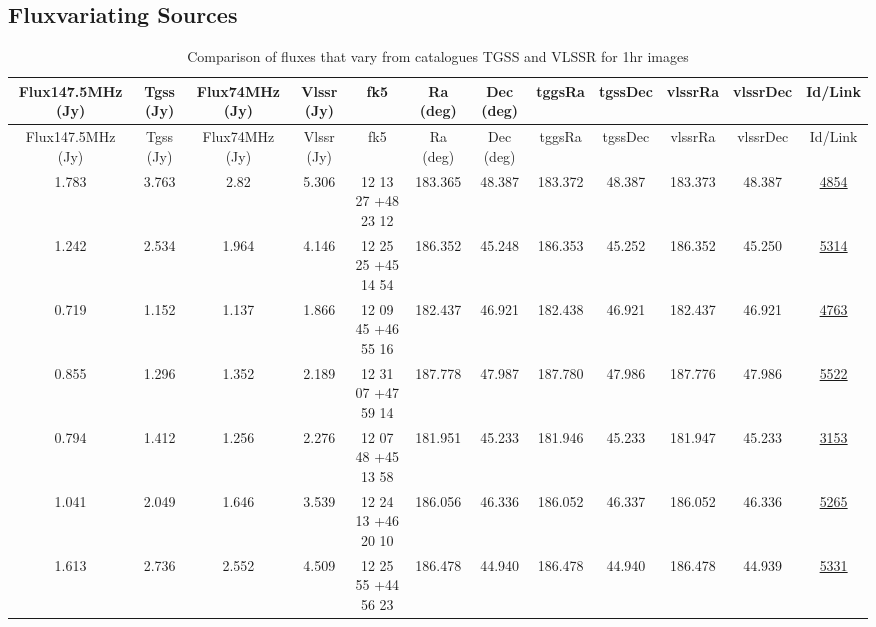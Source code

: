 \documentclass{article}
\begin{document}
\begin{landscape}

\section{Fluxvariating Sources}\label{varsection:KmeulenSimSource:1hr}

\begin{longtable}{c|c|c|c|c|c|c|c|c|c|c|c} 
\toprule 
Flux147.5MHz (Jy) & Tgss (Jy) & Flux74MHz (Jy)& Vlssr (Jy) & fk5 & Ra (deg) & Dec (deg) &tggsRa&tgssDec&vlssrRa&vlssrDec& Id/Link \\\midrule 
\endfirsthead 
\toprule 
Flux147.5MHz (Jy) & Tgss (Jy) & Flux74MHz (Jy)& Vlssr (Jy)& fk5 & Ra (deg) & Dec (deg)  &tggsRa&tgssDec&vlssrRa&vlssrDec& Id/Link \\\midrule 
\endhead 
\bottomrule 
\endfoot 
\bottomrule
\caption{ Comparison of fluxes that vary from catalogues TGSS and VLSSR for 1hr images} 
\endlastfoot
\label{KmeulenSimSource:1hr:tablevar}
1.783 & 3.763 & 2.82 & 5.306 & 12 13 27 +48 23 12 &  183.365 & 48.387 &  183.372 & 48.387 & 183.373 & 48.387 & \href{http://banana.transientskp.org/r4/vlo_KmeulenSimSource/runningcatalog/4854}{4854}  \\
1.242 & 2.534 & 1.964 & 4.146 & 12 25 25 +45 14 54 &  186.352 & 45.248 &  186.353 & 45.252 & 186.352 & 45.250 & \href{http://banana.transientskp.org/r4/vlo_KmeulenSimSource/runningcatalog/5314}{5314}  \\
0.719 & 1.152 & 1.137 & 1.866 & 12 09 45 +46 55 16 &  182.437 & 46.921 &  182.438 & 46.921 & 182.437 & 46.921 & \href{http://banana.transientskp.org/r4/vlo_KmeulenSimSource/runningcatalog/4763}{4763}  \\
0.855 & 1.296 & 1.352 & 2.189 & 12 31 07 +47 59 14 &  187.778 & 47.987 &  187.780 & 47.986 & 187.776 & 47.986 & \href{http://banana.transientskp.org/r4/vlo_KmeulenSimSource/runningcatalog/5522}{5522}  \\
0.794 & 1.412 & 1.256 & 2.276 & 12 07 48 +45 13 58 &  181.951 & 45.233 &  181.946 & 45.233 & 181.947 & 45.233 & \href{http://banana.transientskp.org/r4/vlo_KmeulenSimSource/runningcatalog/3153}{3153}  \\
1.041 & 2.049 & 1.646 & 3.539 & 12 24 13 +46 20 10 &  186.056 & 46.336 &  186.052 & 46.337 & 186.052 & 46.336 & \href{http://banana.transientskp.org/r4/vlo_KmeulenSimSource/runningcatalog/5265}{5265}  \\
1.613 & 2.736 & 2.552 & 4.509 & 12 25 55 +44 56 23 &  186.478 & 44.940 &  186.478 & 44.940 & 186.478 & 44.939 & \href{http://banana.transientskp.org/r4/vlo_KmeulenSimSource/runningcatalog/5331}{5331}  \\

\end{longtable}
\end{landscape}
\end{document}
